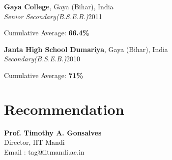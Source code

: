 \documentclass[a4paper,margin,line]{resume}
\begin{document}
\begin{resume}
	\textbf{Gaya College}, Gaya (Bihar), India\\%
	\textsl{Senior Secondary(B.S.E.B.)}\hfill 2011\vspace{-3mm}\\%
	\begin{list2}%
		\item Cumulative Average: \textbf{66.4\%}%

	\end{list2}%

	\textbf{Janta High School Dumariya}, Gaya (Bihar), India\\%
	\textsl{Secondary(B.S.E.B.)}\hfill 2010\vspace{-3mm}\\%
	\begin{list2}%
		\item Cumulative Average: \textbf{71\%}%

	\end{list2}%


	










\section{\mysidestyle Recommendation}

	\textbf{Prof.  Timothy A. Gonsalves}\\
	Director, IIT Mandi\\
	Email :  tag@iitmandi.ac.in




\end{resume}
\end{document}
